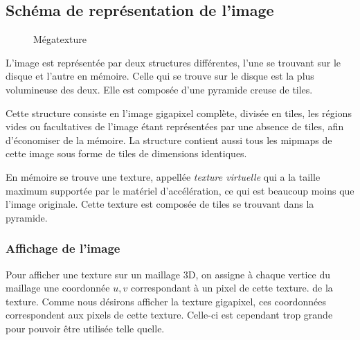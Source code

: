 		\subsection{Schéma de représentation de l'image}
			\begin{figure}[h]
				\centering
				\caption{Mégatexture}
				\label{fig:editmegatex}
			\end{figure}
		L'image est représentée par deux structures différentes, l'une se trouvant sur le disque et l'autre en mémoire.
		Celle qui se trouve sur le disque est la plus volumineuse des deux. Elle est composée d'une pyramide creuse de tiles. 

		Cette structure consiste en l'image gigapixel complète, divisée en tiles, les régions vides ou facultatives de l'image étant représentées par une absence
		de tiles, afin d'économiser de la mémoire. La structure contient aussi tous les mipmaps de cette image sous forme de tiles de dimensions identiques.

		En mémoire se trouve une texture, appellée \emph{texture virtuelle} qui a la taille maximum supportée par le matériel d'accélération, 
		ce qui est beaucoup moins que l'image originale. Cette texture est composée de tiles se trouvant dans la pyramide.
		
		\subsubsection{Affichage de l'image}
			Pour afficher une texture sur un maillage 3D, on assigne à chaque vertice  du maillage une coordonnée $u,v$ correspondant à un pixel de cette texture.
			de la texture. Comme nous désirons afficher la texture gigapixel, ces coordonnées correspondent aux pixels de cette texture.
			Celle-ci est cependant trop grande pour pouvoir être utilisée telle quelle.
			
